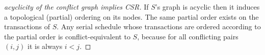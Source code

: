 \begin{proof}[acyclicity of the conflict graph implies CSR]
    If $S$'s graph is acyclic then it induces a topological (partial) ordering on its nodes. 
    The same partial order exists on the transactions of $S$. 
    Any serial schedule whose transactions are ordered according to the partial order is conflict-equivalent to $S$, because for all conflicting pairs $(i,j)$ it is always $i<j$. 
\end{proof}